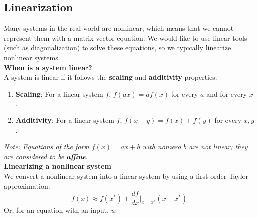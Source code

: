 

\def\title{Worksheet 9}

\newcommand{\qitem}{\qpart\item}

\renewcommand{\labelenumi}{(\alph{enumi})} %
\renewcommand{\theenumi}{(\alph{enumi})} %
\renewcommand{\labelenumii}{\roman{enumii}.} %
\renewcommand{\theenumii}{\roman{enumii}.}
    \maketitle

    \vspace{0.5em}

    \subsection*{Linearization}
    Many systems in the real world are nonlinear, which means that we cannot represent them with a matrix-vector equation.
    We would like to use linear tools (such as diagonalization) to solve these equations, so we typically linearize nonlinear systems. \\
    \newline
    \textbf{When is a system linear?} \\
    \newline
    A system is linear if it follows the \textbf{scaling} and \textbf{additivity} properties:
    \begin{enumerate}
        \item \textbf{Scaling}: For a linear system $f$, $\boxed{f(ax) = af(x)}$ for every $a$ and for every $x$.
        \item \textbf{Additivity}: For a linear system $f$, $\boxed{f(x + y) = f(x) + f(y)}$ for every $x, y$.
    \end{enumerate}
    \textit{Note: Equations of the form $f(x) = ax + b$ with nonzero $b$ are not linear; they are considered to be \textbf{affine}}. \\
    \newline
    \textbf{Linearizing a nonlinear system} \\
    \newline
    We convert a nonlinear system into a linear system by using a first-order Taylor approximation:
    $$\boxed{f(x) \approx f(x^*) + \frac{df}{dx} \bigg\rvert_{x = x^*} (x - x^*)}$$
    Or, for an equation with an input, $u$:
